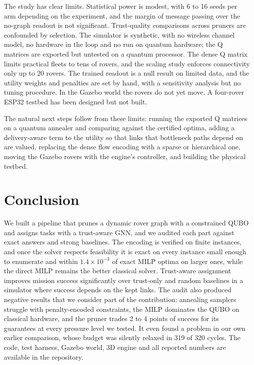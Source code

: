 \documentclass[11pt]{article}
\begin{document}
The study has clear limits. Statistical power is modest, with 6 to 16 seeds
per arm depending on the experiment, and the margin of message passing over
the no-graph readout is not significant. Trust-quality comparisons across
pruners are confounded by selection. The simulator is synthetic, with no
wireless channel model, no hardware in the loop and no run on quantum
hardware; the Q matrices are exported but untested on a quantum processor. The
dense Q matrix limits practical fleets to tens of rovers, and the scaling
study enforces connectivity only up to 20 rovers. The trained readout is a
null result on limited data, and the utility weights and penalties are set by
hand, with a sensitivity analysis but no tuning procedure. In the Gazebo world
the rovers do not yet move. A four-rover ESP32 testbed has been designed but
not built.

The natural next steps follow from these limits: running the exported Q
matrices on a quantum annealer and comparing against the certified optima,
adding a delivery-aware term to the utility so that links that bottleneck
paths depend on are valued, replacing the dense flow encoding with a sparse or
hierarchical one, moving the Gazebo rovers with the engine's controller, and
building the physical testbed.

\section{Conclusion}

We built a pipeline that prunes a dynamic rover graph with a constrained QUBO
and assigns tasks with a trust-aware GNN, and we audited each part against
exact answers and strong baselines. The encoding is verified on finite
instances, and once the solver respects feasibility it is exact on every
instance small enough to enumerate and within $1.4\times10^{-3}$ of exact MILP
optima on larger ones, while the direct MILP remains the better classical
solver. Trust-aware assignment improves mission success significantly over
trust-only and random baselines in a simulator where success depends on the
kept links. The audit also produced negative results that we consider part of
the contribution: annealing samplers struggle with penalty-encoded
constraints, the MILP dominates the QUBO on classical hardware, and the pruner
trades 2 to 4 points of success for its guarantees at every pressure level we
tested. It even found a problem in our own earlier comparison, whose budget
was silently relaxed in 319 of 320 cycles. The code, test harness, Gazebo
world, 3D engine and all reported numbers are available in the repository.
\end{document}
